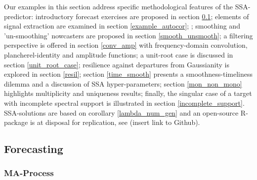 \documentclass[a4paper]{article}
\begin{document}
Our examples in this section address specific methodological features of the SSA-predictor: introductory forecast exercises are proposed in section \ref{one_step_fore}; elements of signal extraction are examined in section \ref{example_autocor}; %
;  smoothing and 'un-smoothing' nowcasters are proposed  in section \ref{smooth_unsmooth}; a filtering perspective is offered in section \ref{conv_amp} with frequency-domain convolution, plancherel-identity and amplitude functions; a unit-root case is discussed in section \ref{unit_root_case}; resilience against departures from Gaussianity is explored in section \ref{resil}; section \ref{time_smooth} presents a  smoothness-timeliness dilemma and a discussion of SSA hyper-parameters; section \ref{mon_non_mono} highlights multiplicity and uniqueness results; finally, the singular case of a target with incomplete spectral support is illustrated in section \ref{incomplete_support}. SSA-solutions are based on corollary \ref{lambda_num_gen} %
and an open-source R-package is at disposal for replication, see (insert link to Github). 

\subsection{Forecasting}\label{one_step_fore}


\subsubsection{MA-Process}
\end{document}
